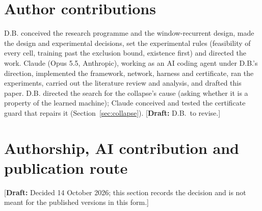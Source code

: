 \documentclass[11pt]{article}
\newcommand{\draftnote}[1]{\textcolor{red!70!black}{[\textbf{Draft:} #1]}}
\begin{document}
\section*{Author contributions}
\label{sec:contributions}
D.B. conceived the research programme and the window-recurrent design, made the design and
experimental decisions, set the experimental rules (feasibility of every cell, training past the
exclusion bound, existence first) and directed the work. Claude (Opus 5.5, Anthropic), working as an
AI coding agent under D.B.'s direction, implemented the framework, network, harness and
certificate, ran the experiments, carried out the literature review and analysis, and drafted this
paper. D.B. directed the search for the collapse's cause (asking whether it is a property of the
learned machine); Claude conceived and tested the certificate guard that repairs it
(Section~\ref{sec:collapse}). \draftnote{D.B.\ to revise.}

\section*{Authorship, AI contribution and publication route}
\label{sec:authorship}
\draftnote{Decided 14 October 2026; this section records the decision and is not meant for the
published versions in this form.}
\end{document}
